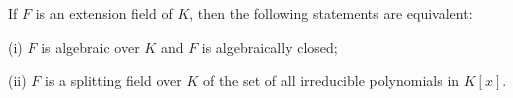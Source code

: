 If $F$ is an extension field of $K$, then the following statements are equivalent:

(i) $F$ is algebraic over $K$ and $F$ is algebraically closed;

(ii) $F$ is a splitting field over $K$ of the set of all irreducible polynomials in $K[x]$.
